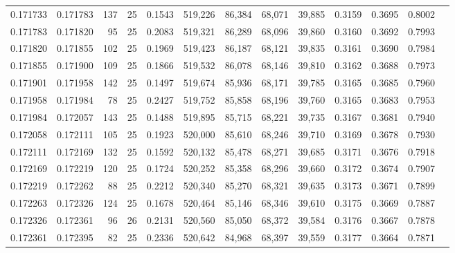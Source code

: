 \begin{tabular}{rrrrrrrrrrrrr}
0.171733 & 0.171783 &   137 &  25 &                                     0.1543 & 519,226 &  86,384 &  68,071 &  39,885 & 0.3159 & 0.3695 & 0.8002 \\
0.171783 & 0.171820 &    95 &  25 &                                     0.2083 & 519,321 &  86,289 &  68,096 &  39,860 & 0.3160 & 0.3692 & 0.7993 \\
0.171820 & 0.171855 &   102 &  25 &                                     0.1969 & 519,423 &  86,187 &  68,121 &  39,835 & 0.3161 & 0.3690 & 0.7984 \\
0.171855 & 0.171900 &   109 &  25 &                                     0.1866 & 519,532 &  86,078 &  68,146 &  39,810 & 0.3162 & 0.3688 & 0.7973 \\
0.171901 & 0.171958 &   142 &  25 &                                     0.1497 & 519,674 &  85,936 &  68,171 &  39,785 & 0.3165 & 0.3685 & 0.7960 \\
0.171958 & 0.171984 &    78 &  25 &                                     0.2427 & 519,752 &  85,858 &  68,196 &  39,760 & 0.3165 & 0.3683 & 0.7953 \\
0.171984 & 0.172057 &   143 &  25 &                                     0.1488 & 519,895 &  85,715 &  68,221 &  39,735 & 0.3167 & 0.3681 & 0.7940 \\
0.172058 & 0.172111 &   105 &  25 &                                     0.1923 & 520,000 &  85,610 &  68,246 &  39,710 & 0.3169 & 0.3678 & 0.7930 \\
0.172111 & 0.172169 &   132 &  25 &                                     0.1592 & 520,132 &  85,478 &  68,271 &  39,685 & 0.3171 & 0.3676 & 0.7918 \\
0.172169 & 0.172219 &   120 &  25 &                                     0.1724 & 520,252 &  85,358 &  68,296 &  39,660 & 0.3172 & 0.3674 & 0.7907 \\
0.172219 & 0.172262 &    88 &  25 &                                     0.2212 & 520,340 &  85,270 &  68,321 &  39,635 & 0.3173 & 0.3671 & 0.7899 \\
0.172263 & 0.172326 &   124 &  25 &                                     0.1678 & 520,464 &  85,146 &  68,346 &  39,610 & 0.3175 & 0.3669 & 0.7887 \\
0.172326 & 0.172361 &    96 &  26 &                                     0.2131 & 520,560 &  85,050 &  68,372 &  39,584 & 0.3176 & 0.3667 & 0.7878 \\
0.172361 & 0.172395 &    82 &  25 &                                     0.2336 & 520,642 &  84,968 &  68,397 &  39,559 & 0.3177 & 0.3664 & 0.7871 \\

\end{tabular}

